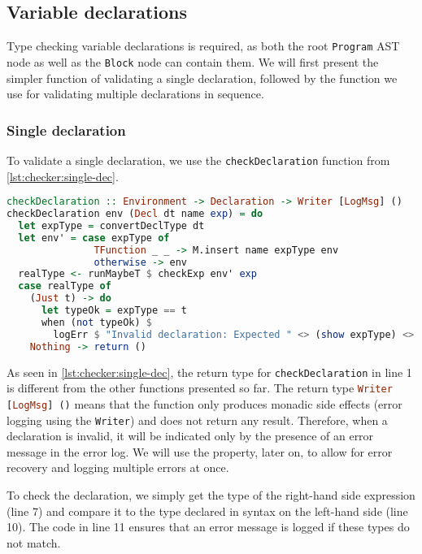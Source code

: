 \subsection{Variable declarations}
Type checking variable declarations is required, as both the root \lstinline{Program} AST node as well as the \lstinline{Block} node can contain them. We will first present the simpler function of validating a single declaration, followed by the function we use for validating multiple declarations in sequence.

\subsubsection{Single declaration}
To validate a single declaration, we use the \lstinline{checkDeclaration} function from \cref{lst:checker:single-dec}. 

\begin{lstlisting}[language=haskell,
caption={Function for type checking a single declaration},
label=lst:checker:single-dec]
checkDeclaration :: Environment -> Declaration -> Writer [LogMsg] ()
checkDeclaration env (Decl dt name exp) = do
  let expType = convertDeclType dt
  let env' = case expType of
               TFunction _ _ -> M.insert name expType env
               otherwise -> env
  realType <- runMaybeT $ checkExp env' exp
  case realType of
    (Just t) -> do
      let typeOk = expType == t
      when (not typeOk) $
        logErr $ "Invalid declaration: Expected " <> (show expType) <> " but got " <> (show t)
    Nothing -> return ()
\end{lstlisting}

\par As seen in \cref{lst:checker:single-dec}, the return type for \lstinline{checkDeclaration} in line 1 is different from the other functions presented so far. The return type \lstinline[language=haskell]{Writer [LogMsg] ()} means that the function only produces monadic side effects (error logging using the \lstinline{Writer}) and does not return any result. Therefore, when a declaration is invalid, it will be indicated only by the presence of an error message in the error log. We will use the property, later on, to allow for error recovery and logging multiple errors at once.
\par To check the declaration, we simply get the type of the right-hand side expression (line 7) and compare it to the type declared in syntax on the left-hand side (line 10). The code in line 11 ensures that an error message is logged if these types do not match.

